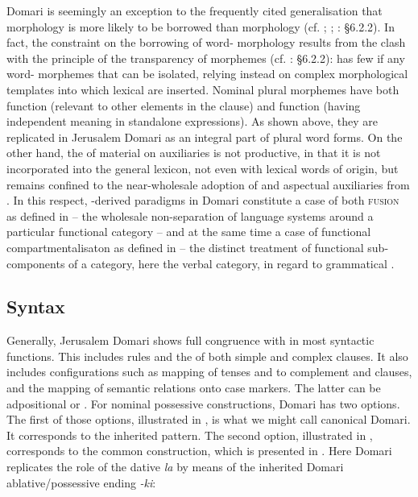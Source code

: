 \documentclass[output=paper]{langsci/langscibook}
\begin{document}
Domari is seemingly an exception to the frequently cited generalisation that  morphology is more likely to be borrowed than  morphology (cf. \citealt{Moravcsik1978}; \citealt{Field2002}; \citealt{Matras2009}: §6.2.2). In fact, the constraint on the borrowing of word- morphology results from the clash with the principle of the transparency of morphemes (cf. \citealt{Matras2009}: §6.2.2):  has few if any word- morphemes that can be isolated, relying instead on complex morphological templates into which lexical  are inserted. Nominal plural morphemes have both  function (relevant to other elements in the clause) and  function (having independent meaning in standalone expressions). As shown above, they are replicated in Jerusalem Domari as an integral part of  plural word forms. On the other hand, the  of  material on auxiliaries is not productive, in that it is not incorporated into the general lexicon, not even with lexical words of  origin, but remains confined to the near-wholesale adoption of  and aspectual auxiliaries from . In this respect, -derived  paradigms in Domari constitute a case of both \textsc{fusion} as defined in \citet{Matras2009} – the wholesale non-separation of language systems around a particular functional category – and at the same time a case of functional compartmentalisaton as defined in \citet{Matras2015} – the distinct treatment of functional sub-components of a category, here the verbal category, in regard to grammatical . 

\subsection{Syntax}

Generally, Jerusalem Domari shows full congruence with   in most syntactic functions. This includes  rules and the  of both simple and complex clauses. It also includes configurations such as mapping of tenses and  to complement and  clauses, and the mapping of semantic relations onto case markers. The latter can be adpositional or . For nominal possessive constructions, Domari has two options. The first of those options, illustrated in , is what we might call canonical Domari. It corresponds to the inherited  pattern. The second option, illustrated in , corresponds to the common   construction, which is presented in . Here Domari replicates the role of the  dative  \textit{la} by means of the inherited Domari ablative/possessive  ending \textit{-ki}:
\end{document}
